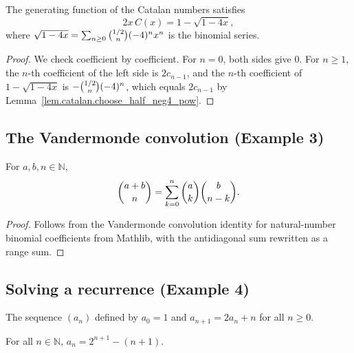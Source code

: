 \begin{theorem}
\label{thm.catalan.gf_explicit}
\leanhelper
\leanok
The generating function of the Catalan numbers satisfies
\[
2x\,C(x) = 1 - \sqrt{1-4x},
\]
where $\sqrt{1-4x} = \sum_{n\geq 0}\dbinom{1/2}{n}(-4)^n x^n$ is the binomial series.
\end{theorem}

\begin{proof}
\leanok
We check coefficient by coefficient. For $n=0$, both sides give $0$.
For $n \geq 1$, the $n$-th coefficient of the left side is $2c_{n-1}$,
and the $n$-th coefficient of $1 - \sqrt{1-4x}$ is $-\dbinom{1/2}{n}(-4)^n$,
which equals $2c_{n-1}$ by Lemma~\ref{lem.catalan.choose_half_neg4_pow}.
\end{proof}

\subsection{The Vandermonde convolution (Example 3)}

\begin{theorem}
\label{thm.vandermonde}
\leanhelper
\leanok
For $a, b, n \in \mathbb{N}$,
\[
\dbinom{a+b}{n} = \sum_{k=0}^{n}\dbinom{a}{k}\dbinom{b}{n-k}.
\]
\end{theorem}

\begin{proof}
\leanok
Follows from the Vandermonde convolution identity for natural-number binomial coefficients
from Mathlib, with the antidiagonal sum
rewritten as a range sum.
\end{proof}

\subsection{Solving a recurrence (Example 4)}

\begin{definition}
\label{def.recurrence.seq}
\leanhelper
\leanok
The sequence $(a_n)$ defined by $a_0 = 1$ and $a_{n+1} = 2a_n + n$ for all $n\geq 0$.
\end{definition}

\begin{theorem}
\label{thm.recurrence.explicit}
\leanhelper
\leanok
For all $n\in\mathbb{N}$, $a_n = 2^{n+1} - (n+1)$.
\end{theorem}

